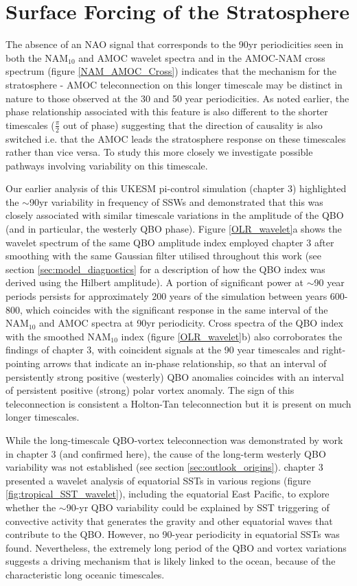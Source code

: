 \section{Surface Forcing of the Stratosphere}\label{surface-strat_forcing}
The absence of an NAO signal that corresponds to the 90yr periodicities seen in both the NAM$_{10}$ and AMOC wavelet spectra and in the  AMOC-NAM cross spectrum (figure \ref{NAM_AMOC_Cross}) indicates that the mechanism for the stratosphere - AMOC teleconnection on this longer timescale may be distinct in nature to those observed at the 30 and 50 year periodicities. As noted earlier, the phase relationship associated with this feature is also different to the shorter timescales ($\frac{\pi}{2}$ out of phase) suggesting that the direction of causality is also switched i.e. that the AMOC leads the stratosphere response on these timescales rather than vice versa. To study this more closely we investigate possible pathways involving variability on this timescale.

Our earlier analysis of this UKESM pi-control simulation (chapter 3) highlighted the $\sim$90yr variability in frequency of SSWs and demonstrated that this was closely associated with similar timescale variations in the amplitude of the QBO (and in particular, the westerly QBO phase). Figure \ref{OLR_wavelet}a shows the wavelet spectrum of the same QBO amplitude index employed chapter 3 after smoothing with the same Gaussian filter utilised throughout this work (see section \ref{sec:model_diagnostics} for a description of how the QBO index was derived using the Hilbert amplitude). A portion of significant power at $\sim$90 year periods persists for approximately 200 years of the simulation between years 600-800, which coincides with the significant response in the same interval of the NAM$_{10}$ and AMOC spectra at 90yr periodicity. Cross spectra of the QBO index with the smoothed NAM$_{10}$ index (figure \ref{OLR_wavelet}b) also corroborates the findings of chapter 3, with coincident signals at the 90 year timescales and right-pointing arrows that indicate an in-phase relationship, so that an interval of persistently strong positive (westerly) QBO anomalies coincides with an interval of persistent positive (strong) polar vortex anomaly. The sign of this teleconnection is consistent a Holton-Tan teleconnection \citep{luDecadalscale2008c, luMechanisms2014c} but it is present on much longer timescales. 

While the long-timescale QBO-vortex teleconnection was demonstrated by work in chapter 3 (and confirmed here), the cause of the long-term westerly QBO variability was not established (see section \ref{sec:outlook_origins}). chapter 3 presented a wavelet analysis of equatorial SSTs in various regions (figure \ref{fig:tropical_SST_wavelet}), including the equatorial East Pacific, to explore whether the $\sim$90-yr QBO variability could be explained by SST triggering of convective activity that generates the gravity and other equatorial waves that contribute to the QBO. However, no 90-year periodicity in equatorial SSTs was found. Nevertheless, the extremely long period of the QBO and vortex variations suggests a driving mechanism that is likely linked to the ocean, because of the characteristic long oceanic timescales.

